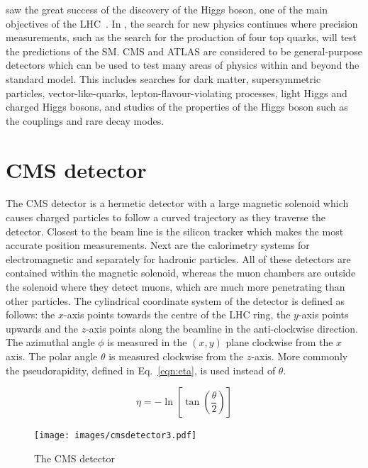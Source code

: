 \runone saw the great success of the discovery of the Higgs boson, one of the main objectives of the LHC~\cite{Aad20121,Chatrchyan201230}. In \runtwo, the search for new physics continues where precision measurements, such as the search for the production of four top quarks, will test the predictions of the SM. CMS and ATLAS are considered to be general-purpose detectors which can be used to test many areas of physics within and beyond the standard model. This includes searches for dark matter, supersymmetric particles, vector-like-quarks, lepton-flavour-violating processes, light Higgs and charged Higgs bosons, and studies of the properties of the Higgs boson such as the couplings and rare decay modes.

\section{CMS detector \label{sec:CMSdet}}

The CMS detector is a hermetic detector with a large magnetic solenoid which causes charged particles to follow a curved trajectory as they traverse the detector. Closest to the beam line is the silicon tracker which makes the most accurate position measurements. Next are the calorimetry systems for electromagnetic and separately for hadronic particles. All of these detectors are contained within the magnetic solenoid, whereas the muon chambers are outside the solenoid where they detect muons, which are much more penetrating than other particles. The cylindrical coordinate system of the detector is defined as follows: the $x$-axis points towards the centre of the LHC ring, the $y$-axis points upwards and the $z$-axis points along the beamline in the anti-clockwise direction. The azimuthal angle $\phi$ is measured in the $(x,y)$ plane clockwise from the $x$ axis. The polar angle $\theta$ is measured clockwise from the $z$-axis. More commonly the pseudorapidity, defined in Eq.~\ref{eqn:eta}, is used instead of $\theta$.

\begin{equation}
    \eta = - \ln \left[ \tan \left(\frac{\theta}{2} \right) \right]
    \label{eqn:eta}
\end{equation}

\begin{figure}[ht!]
\centering
    \texttt{[image: images/cmsdetector3.pdf]}
    \caption{The CMS detector~\cite{1742-6596-513-2-022032}}
    \label{fig:CMSdetector}
\end{figure}


